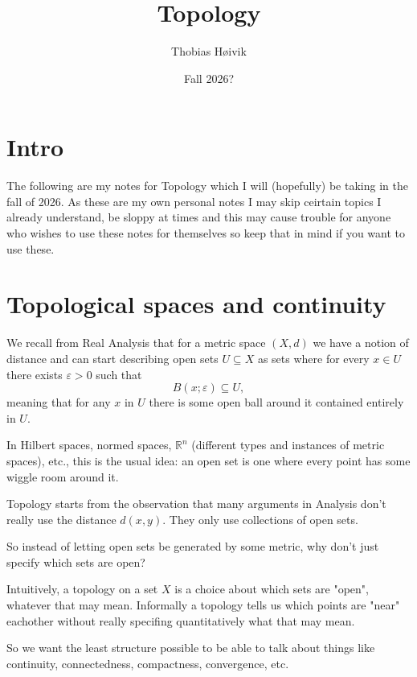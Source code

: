 

\title{\huge{Topology}}
\author{\LARGE{Thobias Høivik}}
\date{Fall 2026?} 


\maketitle

\newpage
\tableofcontents

\newpage
\section*{Intro}
The following are my notes for Topology which I will 
(hopefully) be taking in the fall of 2026. 
As these are my own personal notes I may skip ceirtain 
topics I already understand, be sloppy at times and 
this may cause trouble for anyone who wishes 
to use these notes for themselves so keep that in 
mind if you want to use these. 

\section{Topological spaces and continuity}
We recall from Real Analysis that for a metric 
space $(X,d)$ we have a notion of distance 
and can start describing open sets 
$U \subseteq X$ as sets where for every $x \in U$ 
there exists $\varepsilon > 0$ such that 
\[
    B(x;\varepsilon) \subseteq U, 
\]
meaning that for any $x$ in $U$ there is 
some open ball around it contained entirely in $U$.

In Hilbert spaces, normed spaces, $\mathbb R^n$ (different 
types and instances of metric spaces), etc., this is the usual idea: 
an open set is one where every point has some wiggle room around it.

Topology starts from the observation that many arguments in 
Analysis don't really use the distance $d(x,y)$. They only 
use collections of open sets. 

So instead of letting open sets be generated by some metric, why 
don't just specify which sets are open? 

Intuitively, a topology on a set $X$ is a choice about which 
sets are "open", whatever that may mean. 
Informally a topology tells us which points are "near" eachother 
without really specifing quantitatively what that may mean. 

So we want the least structure possible to be able to talk 
about things like continuity, connectedness, compactness, 
convergence, etc. 

